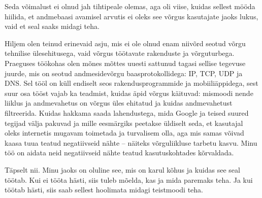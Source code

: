 
Seda võimalust ei olnud jah tihtipeale olemas, aga oli viise, kuidas 
sellest mööda hiilida, et andmebaasi avamisel arvutis ei oleks see võrgus kasutajate jaoks lukus, vaid et seal saaks midagi 
teha. 


Hiljem olen teinud erinevaid asju, mis ei ole olnud enam niivõrd seotud
võrgu tehnilise ülesehitusega, vaid võrgus 
töötavate rakenduste ja võrguturbega. Praeguses töökohas olen mõnes mõttes uuesti
sattunud tagasi sellise tegevuse juurde, mis on seotud andmesidevõrgu 
baasprotokollidega: IP, TCP, UDP ja DNS. Sel tööl on küll
endiselt seos rakendusprogrammide ja mobiiliäppidega, 
sest suur osa tööst vajab ka teadmist, kuidas äpid võrgus käituvad: mismoodi 
nende liiklus ja andmevahetus on võrgus üles ehitatud ja kuidas 
andmevahetust filtreerida. Kuidas hakkama saada lahendustega, 
mida Google ja teised suured tegijad välja pakuvad ja mille eesmärgiks 
peetakse üldiselt seda, et kasutajal oleks internetis mugavam toimetada ja turvalisem olla, aga mis samas võivad kaasa tuua
teatud negatiivseid nähte – näiteks võrguliikluse tarbetu kasvu. Minu töö on 
aidata neid negatiivseid nähte teatud kasutuskohtades kõrvaldada.


Täpselt nii. Minu jaoks on oluline see, mis on karul kõhus ja kuidas see 
seal töötab. Kui ei tööta hästi, siis tuleb mõelda, kas ja mida paremaks teha. Ja 
kui töötab hästi, siis saab sellest hoolimata midagi teistmoodi teha.

